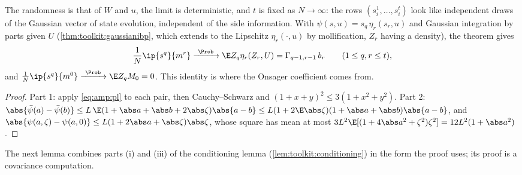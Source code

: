 \begin{refsection}
The randomness is that of $W$ and $u$, the limit is deterministic, and $t$ is fixed as $N\to\infty$: the rows $(s^1_i,\dots,s^t_i)$ look like independent draws of the Gaussian vector of state evolution, independent of the side information. With $\psi(s,u)=s_q\,\eta_r(s_r,u)$ and Gaussian integration by parts given $U$ (\cref{thm:toolkit:gaussianibp}, which extends to the Lipschitz $\eta_r(\cdot,u)$ by mollification, $Z_r$ having a density), the theorem gives
\begin{equation}\label{eq:amp:stein}
\frac1N\ip{s^q}{m^r}\ampto\E Z_q\eta_r(Z_r,U)=\Gamma_{q-1,r-1}\,b_r\qquad(1\le q,r\le t),
\end{equation}
and $\frac1N\ip{s^q}{m^0}\ampto\E Z_qM_0=0$. This identity is where the Onsager coefficient comes from.


\begin{proof}
Part 1: apply \eqref{eq:amp:pl} to each pair, then Cauchy--Schwarz and $(1+x+y)^2\le3(1+x^2+y^2)$. Part 2: $\abs{\bar\psi(a)-\bar\psi(b)}\le L\,\E(1+\abs a+\abs b+2\abs\zeta)\abs{a-b}\le L(1+2\E\abs\zeta)(1+\abs a+\abs b)\abs{a-b}$, and $\abs{\psi(a,\zeta)-\psi(a,0)}\le L(1+2\abs a+\abs\zeta)\abs\zeta$, whose square has mean at most $3L^2\E[(1+4\abs a^2+\zeta^2)\zeta^2]=12L^2(1+\abs a^2)$.
\end{proof}

The next lemma combines parts (i) and (iii) of the conditioning lemma (\cref{lem:toolkit:conditioning}) in the form the proof uses; its proof is a covariance computation.



\end{refsection}
